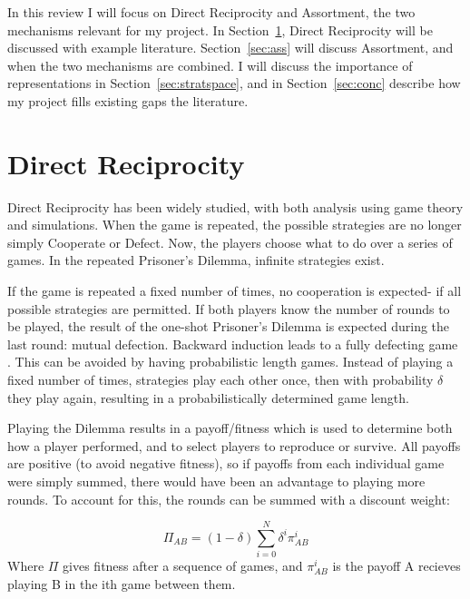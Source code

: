 \documentclass[a4paper,11pt]{article}
\begin{document}
In this review I will focus on Direct Reciprocity and Assortment, the two mechanisms relevant for my project. In Section~\ref{sec:dr}, Direct Reciprocity will be discussed with example literature. Section~\ref{sec:ass} will discuss Assortment, and when the two mechanisms are combined. I will discuss the importance of representations in Section~\ref{sec:stratspace}, and in Section~\ref{sec:conc} describe how my project fills existing gaps the literature.

\section{Direct Reciprocity}
\label{sec:dr}
Direct Reciprocity has been widely studied, with both analysis using game theory and simulations. 
When the game is repeated, the possible strategies are no longer simply Cooperate or Defect. 
Now, the players choose what to do over a series of games. 
In the repeated Prisoner's Dilemma, infinite strategies exist.

If the game is repeated a fixed number of times, no cooperation is expected- if all possible strategies are permitted. If both players know the number of rounds to be played, the result of the one-shot Prisoner's Dilemma is expected during the last round: mutual defection. Backward induction leads to a fully defecting game \citep{aumann1995backward}. This can be avoided by having probabilistic length games. 
Instead of playing a fixed number of times, strategies play each other once, then with probability $\delta$ they play again, resulting in a probabilistically determined game length. 

Playing the Dilemma results in a payoff/fitness which is used to determine both how a player performed, and to select players to reproduce or survive. All payoffs are positive (to avoid negative fitness), so if payoffs from each individual game were simply summed, there would have been an advantage to playing more rounds. To account for this, the rounds can be summed with a discount weight:

\begin{equation}
\Pi_{AB}=(1-\delta)\sum^{N}_{i=0}{\delta^i\pi^i_{AB}}
\end{equation}
Where $\Pi$ gives fitness after a sequence of games, and $\pi^i_{AB}$ is the payoff A recieves playing B in the ith game between them.
\end{document}

